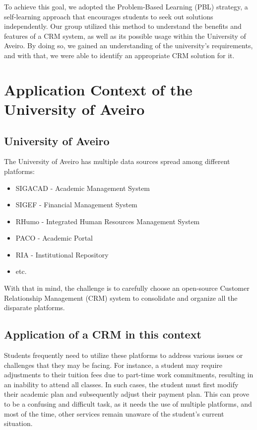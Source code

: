 \documentclass{article}
\begin{document}
To achieve this goal, we adopted the Problem-Based Learning (PBL) strategy, a self-learning approach that encourages students to seek out solutions independently. Our group utilized this method to understand the benefits and features of a CRM system, as well as its possible usage within the University of Aveiro. By doing so, we gained an understanding of the university's requirements, and with that, we were able to identify an appropriate CRM solution for it.

\section{Application Context of the University of Aveiro}

\subsection{University of Aveiro}

The University of Aveiro has multiple data sources spread among different platforms:

\begin{itemize}
    \item SIGACAD - Academic Management System
    \item SIGEF - Financial Management System
    \item RHumo - Integrated Human Resources Management System
    \item PACO - Academic Portal
    \item RIA - Institutional Repository
    \item etc.
\end{itemize}

With that in mind, the challenge is to carefully choose an open-source Customer Relationship Management (CRM) system to consolidate and organize all the disparate platforms.

\subsection{Application of a CRM in this context}

Students frequently need to utilize these platforms to address various issues or challenges that they may be facing. For instance, a student may require adjustments to their tuition fees due to part-time work commitments, resulting in an inability to attend all classes. In such cases, the student must first modify their academic plan and subsequently adjust their payment plan. This can prove to be a confusing and difficult task, as it needs the use of multiple platforms, and most of the time, other services remain unaware of the student's current situation.
\end{document}
